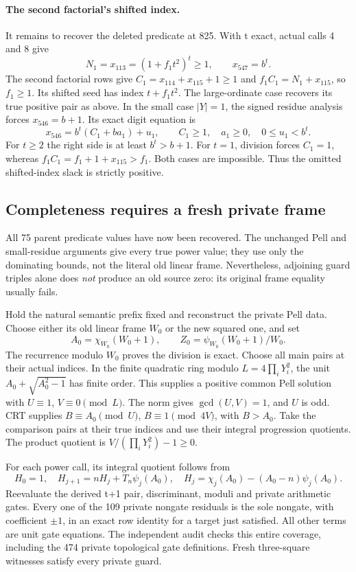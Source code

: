\paragraph{The second factorial's shifted index.}
It remains to recover the deleted predicate at 825.  With t exact,
actual calls 4 and 8 give
\[
 N_1=x_{113}=(1+f_1t^2)^t\ge1,\qquad x_{547}=b^t.
\]
The second factorial rows give
$C_1=x_{114}+x_{115}+1\ge1$ and $f_1C_1=N_1+x_{115}$,
so $f_1\ge1$.  Its shifted seed has index $t+f_1t^2$.
The large-ordinate case recovers its true positive pair as above.
In the small case $|Y|=1$, the signed residue analysis forces
$x_{546}=b+1$.  Its exact digit equation is
\[
 x_{546}=b^t(C_1+ba_1)+u_1,\qquad
 C_1\ge1,\quad a_1\ge0,\quad0\le u_1<b^t.
\]
For $t\ge2$ the right side is at least $b^t>b+1$.
For $t=1$, division forces $C_1=1$, whereas
$f_1C_1=f_1+1+x_{115}>f_1$.  Both cases are impossible.
Thus the omitted shifted-index slack is strictly positive.

\subsection{Completeness requires a fresh private frame}

All 75 parent predicate values have now been recovered.  The unchanged
Pell and small-residue arguments give every true power value; they
use only the dominating bounds, not the literal old linear frame.
Nevertheless, adjoining guard triples alone does \emph{not} produce
an old source zero: its original frame equality usually fails.

Hold the natural semantic prefix fixed and reconstruct the private
Pell data.  Choose either its old linear frame $W_0$ or the new squared
one, and set
\[
 A_0=\chi_{W_0}(W_0+1),\qquad
 Z_0=\psi_{W_0}(W_0+1)/W_0.
\]
The recurrence modulo $W_0$ proves the division is exact.  Choose
all main pairs at their actual indices.  In the finite quadratic
ring modulo $L=4\prod_iY_i^2$, the unit
$A_0+\sqrt{A_0^2-1}$ has finite order.  This supplies a positive
common Pell solution with $U\equiv1$, $V\equiv0\pmod L$.
The norm gives $\gcd(U,V)=1$, and $U$ is odd.  CRT supplies
$B\equiv A_0\pmod U$, $B\equiv1\pmod{4V}$, with $B>A_0$.
Take the comparison pairs at their true indices and use their
integral progression quotients.  The product quotient is
$V/(\prod_iY_i^2)-1\ge0$.

For each power call, its integral quotient follows from
\[
 H_0=1,\quad H_{j+1}=nH_j+T_n\psi_j(A_0),\quad
 H_j=\chi_j(A_0)-(A_0-n)\psi_j(A_0).
\]
Reevaluate the derived t+1 pair, discriminant, moduli and private
arithmetic gates.  Every one of the 109 private nongate residuals
is the sole nongate, with coefficient $\pm1$, in an exact row
identity for a target just satisfied.  All other terms are unit
gate equations.  The independent audit checks this entire coverage,
including the 474 private topological gate definitions.  Fresh
three-square witnesses satisfy every private guard.

